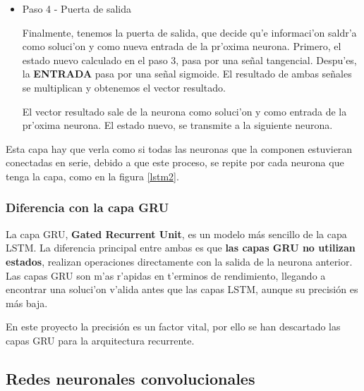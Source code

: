 \begin{itemize}
\item Paso 4 - Puerta de salida  

Finalmente, tenemos la puerta de salida, que decide qu'e informaci'on saldr'a como soluci'on y como nueva entrada de la pr'oxima neurona.  
Primero, el estado nuevo calculado en el paso 3, pasa por una  señal tangencial. Despu'es, la \textbf{ENTRADA} pasa por una señal sigmoide. El resultado de ambas señales se multiplican y obtenemos el vector resultado.


El vector resultado sale de la neurona como soluci'on y como entrada de la pr'oxima neurona. El estado nuevo, se transmite a la siguiente neurona.
\end{itemize}



Esta capa hay que verla como si todas las neuronas que la componen estuvieran conectadas en serie, debido a que este proceso, se repite por cada neurona que tenga la capa, como en la figura \ref{lstm2}.





\subsubsection{Diferencia con la capa GRU}

La capa GRU, \textbf{Gated Recurrent Unit}, es un modelo más sencillo de la capa LSTM.
La diferencia principal entre ambas es que \textbf{las capas GRU no utilizan estados}, realizan operaciones directamente con la salida de la neurona anterior.
Las capas GRU son m'as r'apidas en t'erminos de rendimiento, llegando a encontrar una soluci'on v'alida antes que las capas LSTM, aunque su precisión es más baja.



En este proyecto la precisión es un factor vital, por ello se han descartado las capas GRU para la arquitectura recurrente.

\clearpage

\subsection{Redes neuronales convolucionales}

